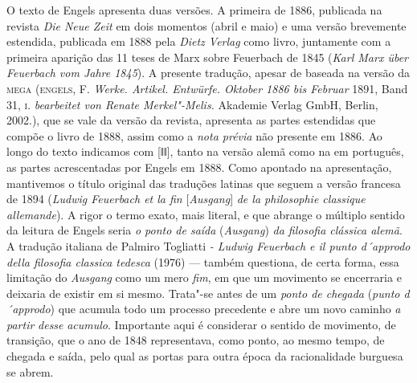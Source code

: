 O texto de Engels apresenta duas versões. A primeira de 1886, publicada
na revista \emph{Die Neue Zeit} em dois momentos (abril e maio) e uma
versão brevemente estendida, publicada em 1888 pela \emph{Dietz Verlag}
como livro, juntamente com a primeira aparição das 11 teses de Marx
sobre Feuerbach de 1845 (\emph{Karl Marx über Feuerbach vom Jahre
1845}). A presente tradução, apesar de baseada na versão da \textsc{mega}
(\textsc{engels}, F. \emph{Werke. Artikel. Entwürfe. Oktober 1886 bis Februar}
1891, Band 31, \textsc{i}. \emph{bearbeitet von Renate Merkel"-Melis.} Akademie
Verlag GmbH, Berlin, 2002.), que se vale da versão da revista,
apresenta as partes estendidas que compõe o livro de 1888, assim como a
\emph{nota prévia} não presente em 1886. Ao longo do texto indicamos com
{[}ǁǁ{]}, tanto na versão alemã como na em português, as partes
acrescentadas por Engels em 1888. Como apontado na apresentação,
mantivemos o título original das traduções latinas que seguem a versão
francesa de 1894 (\emph{Ludwig Feuerbach et la fin} {[}\emph{Ausgang}{]}
\emph{de la philosophie classique allemande}). A rigor o termo exato,
mais literal, e que abrange o múltiplo sentido da leitura de Engels
seria \emph{o ponto de saída} (\emph{Ausgang}) \emph{da filosofia
clássica alemã}. A tradução italiana de Palmiro Togliatti \emph{- Ludwig
Feuerbach e il punto d´approdo della filosofia classica tedesca} (1976)
--- também questiona, de certa forma, essa limitação do \emph{Ausgang}
como um mero \emph{fim}, em que um movimento se encerraria e deixaria de
existir em si mesmo. Trata"-se antes de um \emph{ponto de chegada}
(\emph{punto d´approdo}) que acumula todo um processo precedente e abre
um novo caminho \emph{a partir} \emph{desse} \emph{acumulo}. Importante
aqui é considerar o sentido de movimento, de transição, que o ano de
1848 representava, como ponto, ao mesmo tempo, de chegada e saída, pelo
qual as portas para outra época da racionalidade burguesa se abrem.
